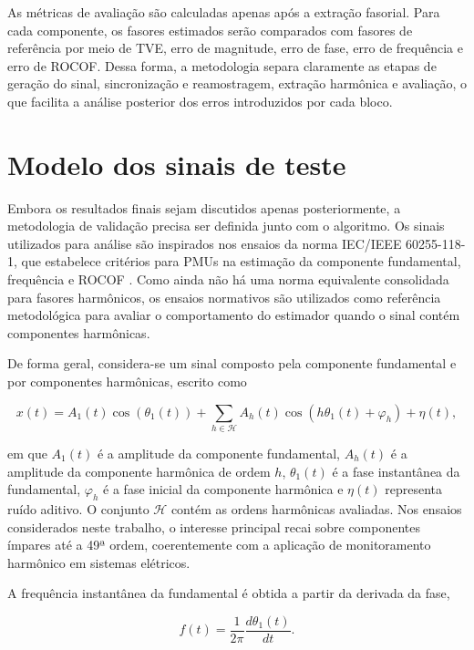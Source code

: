 As métricas de avaliação são calculadas apenas após a extração fasorial. Para cada componente, os fasores estimados serão comparados com fasores de referência por meio de TVE, erro de magnitude, erro de fase, erro de frequência e erro de ROCOF. Dessa forma, a metodologia separa claramente as etapas de geração do sinal, sincronização e reamostragem, extração harmônica e avaliação, o que facilita a análise posterior dos erros introduzidos por cada bloco.

\section{Modelo dos sinais de teste}

Embora os resultados finais sejam discutidos apenas posteriormente, a metodologia de validação precisa ser definida junto com o algoritmo. Os sinais utilizados para análise são inspirados nos ensaios da norma IEC/IEEE 60255-118-1, que estabelece critérios para PMUs na estimação da componente fundamental, frequência e ROCOF \cite{iec60255}. Como ainda não há uma norma equivalente consolidada para fasores harmônicos, os ensaios normativos são utilizados como referência metodológica para avaliar o comportamento do estimador quando o sinal contém componentes harmônicas.

De forma geral, considera-se um sinal composto pela componente fundamental e por componentes harmônicas, escrito como

\begin{equation}
x(t) = A_1(t)\cos\left(\theta_1(t)\right) + \sum_{h \in \mathcal{H}} A_h(t)\cos\left(h\theta_1(t) + \varphi_h\right) + \eta(t),
\label{eq:sinal_harmonico_metodologia}
\end{equation}

\noindent em que $A_1(t)$ é a amplitude da componente fundamental, $A_h(t)$ é a amplitude da componente harmônica de ordem $h$, $\theta_1(t)$ é a fase instantânea da fundamental, $\varphi_h$ é a fase inicial da componente harmônica e $\eta(t)$ representa ruído aditivo. O conjunto $\mathcal{H}$ contém as ordens harmônicas avaliadas. Nos ensaios considerados neste trabalho, o interesse principal recai sobre componentes ímpares até a 49ª ordem, coerentemente com a aplicação de monitoramento harmônico em sistemas elétricos.

A frequência instantânea da fundamental é obtida a partir da derivada da fase,

\begin{equation}
f(t) = \frac{1}{2\pi}\frac{d\theta_1(t)}{dt}.
\label{eq:freq_instantanea}
\end{equation}

